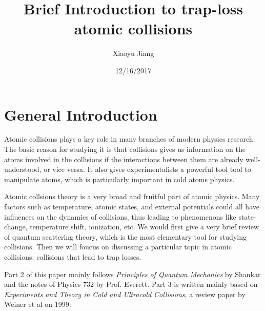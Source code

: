 \documentclass{article}
\title{Brief Introduction to trap-loss atomic collisions}
\author{Xiaoyu Jiang}
\date{12/16/2017}
\begin{document}
\maketitle
\section{General Introduction}
Atomic collisions plays a key role in many branches of modern physics research. The basic reason for studying it is that collisions gives us information on the atoms involved in the collisions if the interactions between them are already well-understood, or vice versa. It also gives experimentalists a powerful tool tool to manipulate atoms, which is particularly important in cold atoms physics. 

Atomic collsions theory is a very broad and fruitful part of atomic physics. Many factors such as temperature, atomic states, and external potentials could all have influences on the dynamics of collisions, thus leading to phenomenons like state-change, temperature shift, ionization, etc. We would first give a very brief review of quantum scattering theory, which is the most elementary tool for studying collisions. Then we will foucus on discussing a particular topic in atomic collisions: collisions that lead to trap losses.

Part 2 of this paper mainly follows \emph{Principles of Quantum Mechanics} by Shankar and the notes of Physics 732 by Prof. Everett. Part 3 is written mainly based on \emph{Experiments and Theory in Cold and Ultracold Collisions}, a review paper by Weiner et al on 1999. 
\end{document}
